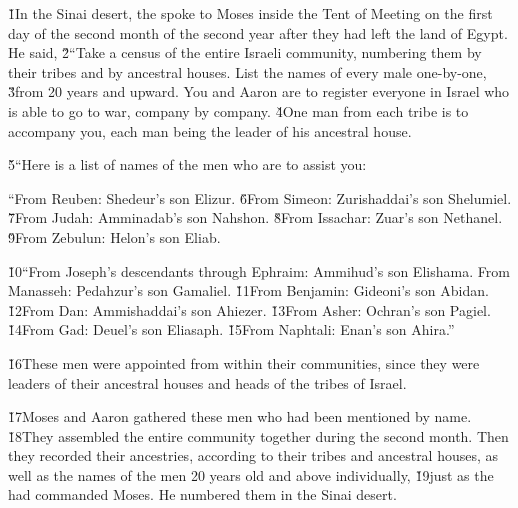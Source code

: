 


\v{1}In the Sinai desert, the  spoke to Moses inside the Tent of Meeting on the first day of the second month of the second year after they had left the land of Egypt. He said, \v{2}``Take a census of the entire Israeli community, numbering them by their tribes and by ancestral houses. List the names of every male one-by-one, \v{3}from 20 years and upward. You and Aaron are to register everyone in Israel who is able to go to war, company by company. \v{4}One man from each tribe is to accompany you, each man being the leader of his ancestral house.

\v{5}``Here is a list of names of the men who are to assist you:

``From Reuben: Shedeur's son Elizur. \v{6}From Simeon: Zurishaddai's son Shelumiel. \v{7}From Judah: Amminadab's son Nahshon. \v{8}From Issachar: Zuar's son Nethanel. \v{9}From Zebulun: Helon's son Eliab.

\v{10}``From Joseph's descendants through Ephraim: Ammihud's son Elishama. From Manasseh: Pedahzur's son Gamaliel. \v{11}From Benjamin: Gideoni's son Abidan. \v{12}From Dan: Ammishaddai's son Ahiezer. \v{13}From Asher: Ochran's son Pagiel. \v{14}From Gad: Deuel's son Eliasaph. \v{15}From Naphtali: Enan's son Ahira.''

\v{16}These men were appointed from within their communities, since they were leaders of their ancestral houses and heads of the tribes of Israel.

\v{17}Moses and Aaron gathered these men who had been mentioned by name. \v{18}They assembled the entire community together during the second month. Then they recorded their ancestries, according to their tribes and ancestral houses, as well as the names of the men 20 years old and above individually, \v{19}just as the  had commanded Moses. He numbered them in the Sinai desert.

